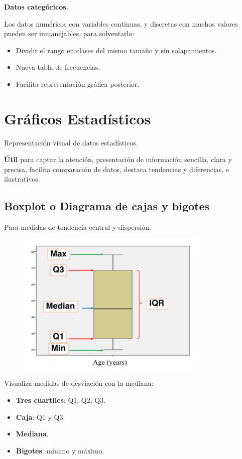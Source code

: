 \documentclass[12pt]{report} %
\begin{document}
\textbf{Datos categóricos.}

Los datos numéricos con variables continuas, y discretas con muchos
valores pueden ser inmanejables, para solventarlo:

\begin{itemize}

\item
  Dividir el rango en clases del mismo tamaño y sin solapamientos.
\item
  Nueva tabla de frecuencias.
\item
  Facilita representación gráfica posterior.
\end{itemize}

\section{Gráficos Estadísticos}

Representación visual de datos estadísticos.

\textbf{Útil} para captar la atención, presentación de información
sencilla, clara y precisa, facilita comparación de datos, destaca
tendencias y diferencias, e ilustrativos.

\subsection{Boxplot o Diagrama de cajas y
bigotes}

Para medidas de tendencia central y dispersión.

\begin{figure}[H]
	{\includegraphics[scale=.5]{Untitled 4.png}}
\end{figure}

Visualiza medidas de desviación con la mediana:

\begin{itemize}

\item
  \textbf{Tres cuartiles}: Q1, Q2, Q3.
\item
  \textbf{Caja}: Q1 y Q3.
\item
  \textbf{Mediana}.
\item
  \textbf{Bigotes}: mínimo y máximo.
\end{itemize}
\end{document}
